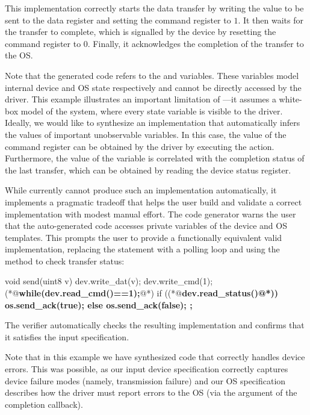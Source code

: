 This implementation correctly starts the data transfer by writing the value to be sent to the data register and setting the command register to $1$.  It then waits for the transfer to complete, which is signalled by the device by resetting the command register to $0$.  Finally, it acknowledges the completion of the transfer to the OS.

Note that the generated code refers to the  and  variables.  These variables model internal device and OS state respectively and cannot be directly accessed by the driver.  This example illustrates an important limitation of \termite---it assumes a white-box model of the system, where every state variable is visible to the driver.  Ideally, we would like to synthesize an implementation that automatically infers the values of important unobservable variables.  In this case, the value of the command register can be obtained by the driver by executing the  action.  Furthermore, the value of the  variable is correlated with the completion status of the last transfer, which can be obtained by reading the device status register.

While \termite currently cannot produce such an implementation automatically, it implements a pragmatic tradeoff that helps the user build and validate a correct implementation with modest manual effort.  The code generator warns the user that the auto-generated code accesses  private variables of the device and OS templates.  This prompts the user to provide a functionally equivalent valid implementation, replacing the  statement with a polling loop and using the  method to check transfer status:

\begin{tsllisting}[keywords=, frame=single]
void send(uint8 v){
    dev.write_dat(v);
    dev.write_cmd(1);
    (*@{\bf\ttfamily while(dev.read\_cmd()==1){};}@*)
    if ((*@\bf\ttfamily dev.read\_status()@*)) {
        os.send_ack(true);
    } else {
        os.send_ack(false);
    };}
\end{tsllisting}

The verifier automatically checks the resulting implementation and confirms that it satisfies the input specification.

Note that in this example we have synthesized code that correctly handles device errors.  This was possible, as our input device specification correctly captures device failure modes (namely, transmission failure) and our OS specification describes how the driver must report errors to the OS (via the  argument of the completion callback).

